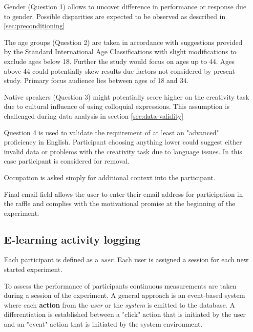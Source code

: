 	Gender (Question 1) allows to uncover difference in performance or response due to gender. Possible disparities are expected to be observed as described in \ref{sec:preconditioning}

	The age groups (Question 2) are taken in accordance with suggestions provided by the Standard International Age Classifications \cite{UN1982} with slight modifications to exclude ages below 18. Further the study would focus on ages up to 44. Ages above 44 could potentially skew results due factors not considered by present study. Primary focus audience lies between ages of 18 and 34.
	
	Native speakers (Question 3) might potentially score higher on the creativity task due to cultural influence of using colloquial expressions. This assumption is challenged during data analysis in section \ref{sec:data-validity}
	
	Question 4 is used to validate the requirement of at least an "advanced" proficiency in English. Participant choosing anything lower could suggest either invalid data or problems with the creativity task due to language issues. In this case participant is considered for removal. 
	
	Occupation is asked simply for additional context into the participant.
	
	Final email field allows the user to enter their email address for participation in the raffle and complies with the motivational promise at the beginning of the experiment.

	\subsection{E-learning activity logging} \label{sec:activitylog}
	
	
	Each participant is defined as a \textit{user}. Each user is assigned a session for each new started experiment. 
	
	To assess the performance of participants continuous measurements are taken during a session of the experiment. A general approach is an event-based system where each \textbf{action} from the \textit{user} or the \textit{system} is emitted to the database. A differentiation is established between a "click" action that is initiated by the user and an "event" action that is initiated by the system environment.
	

